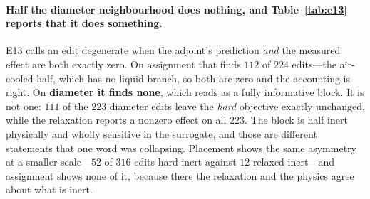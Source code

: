 \documentclass{article}
\newcommand{\Jliq}{J_{\mathrm{liq}}}
\begin{document}
\begin{table}[!t]
\centering
\footnotesize
\setlength{\tabcolsep}{4pt}
\caption{E13: Spearman $\rho$ between the adjoint's first-order prediction of
$\mathrm{d}\Jliq$ and a fresh re-solve, over the single-edit
neighbourhood of eight held-out tasks of the shipped benchmark (placement capped at $40$
moves per task), against the relaxed
re-solve.  \textbf{The assignment row is the all-edits $\rho$ and is not the number this
paper relies on:} half of that neighbourhood is a structural no-op, and \S\ref{sec:relax}
reports the informative half beside it.  Against the hard one the substance is unchanged (diameter $0.936$, placement
$0.994$, assignment $0.166$).  The pre-registered gate---sign $\ge 0.90$ pooled and
$\rho \ge 0.9$ on $\ge 6$ of $8$ tasks per block---\textbf{fails on assignment} and
passes on the other two; the failure is published, not dropped.  Generated from
\texttt{results\_e13.json}---produced by
\texttt{ddl/case/benchC/E13\_fullrank\_ranking/run.py}---by \texttt{measure\_e13.py}; no
number here is typed, and \texttt{check\_tracked\_records.py} fails if this record and the
manuscript disagree.}
\label{tab:e13}
\end{table}

\paragraph{Half the diameter neighbourhood does nothing, and Table~\ref{tab:e13} reports
that it does something.}
E13 calls an edit degenerate when the adjoint's prediction \emph{and} the measured effect
are both exactly zero.  On assignment that finds $112$ of $224$ edits---the air-cooled
half, which has no liquid branch, so both are zero and the accounting is right.  On
\textbf{diameter it finds none}, which reads as a fully informative block.  It is not one:
$111$ of the $223$ diameter edits leave the \emph{hard} objective exactly unchanged, while
the relaxation reports a nonzero effect on all $223$.  The block is half inert physically
and wholly sensitive in the surrogate, and those are different statements that one word was
collapsing.  Placement shows the same asymmetry at a smaller scale---$52$ of $316$ edits
hard-inert against $12$ relaxed-inert---and assignment shows none of it, because there the
relaxation and the physics agree about what is inert.
\end{document}
